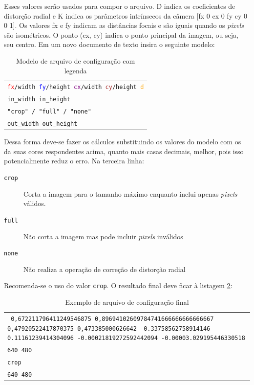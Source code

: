 Esses valores serão usados para compor o arquivo. D indica os coeficientes de distorção radial e K indica os parâmetros intrínsecos da câmera [fx 0 cx 0 fy cy 0 0 1]. Os valores fx e fy indicam as distâncias focais e são iguais quando os \textit{pixels} são isométricos. O ponto (cx, cy) indica o ponto principal da imagem, ou seja, seu centro. Em um novo documento de texto insira o seguinte modelo:

\begin{table}[H]\label{tb:7}
\begin{tabular}{| p{\textwidth}|}
\hline
\texttt{\textcolor{red}{fx}/\textcolor{OliveGreen}{width} \textcolor{blue}{fy}/\textcolor{WildStrawberry}{height} \textcolor{purple}{cx}/\textcolor{OliveGreen}{width} \textcolor{brown}{cy}/\textcolor{WildStrawberry}{height} \textcolor{orange}{d}}\\
\texttt{\textcolor{OliveGreen}{in\_width} \textcolor{WildStrawberry}{in\_height}}\\
\texttt{"crop" / "full" / "none"}\\
\texttt{\textcolor{OliveGreen}{out\_width} \textcolor{WildStrawberry}{out\_height}}\\
\hline
\end{tabular}
\caption{Modelo de arquivo de configuração com legenda}
\end{table}

Dessa forma deve-se fazer os cálculos substituindo os valores do modelo com os da suas cores respondentes acima, quanto mais casas decimais, melhor, pois isso potencialmente reduz o erro. Na terceira linha:

\begin{description}
\item[\texttt{crop}]{Corta a imagem para o tamanho máximo enquanto inclui apenas \textit{pixels} válidos.}
\item[\texttt{full}]{Não corta a imagem mas pode incluir \textit{pixels} inválidos}
\item[\texttt{none}]{Não realiza a operação de correção de distorção radial}
\end{description}

Recomenda-se o uso do valor \texttt{crop}. O resultado final deve ficar à listagem \ref{tb:8}:

\begin{table}[H]\label{tb:8}
\begin{tabular}{| p{\textwidth}|}
\hline
\texttt{
0,672211796411249546875 0,89694102609784741666666666666667 0,47920522417870375 0,473385000626642 -0.33758562758914146 0.11161239414304096 -0.00021819272592442094 -0.00003.029195446330518}\\
\texttt{640 480}\\
\texttt{crop}\\
\texttt{640 480}\\
\hline
\end{tabular}
\caption{Exemplo de arquivo de configuração final}
\end{table}

